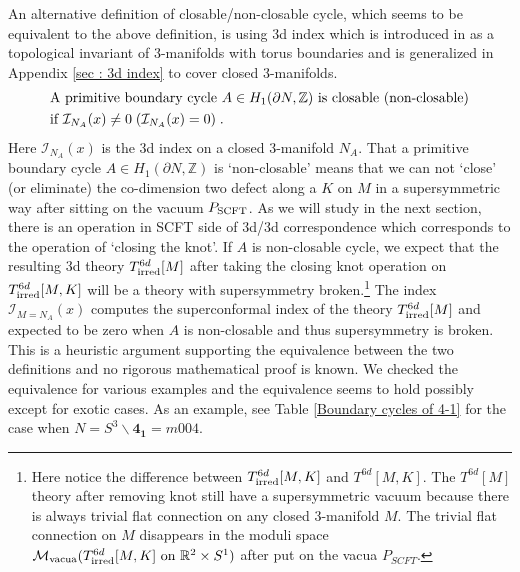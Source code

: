 \documentclass[a4paper,11pt]{article}
\def\CM{{\cal M}}
\begin{document}
An alternative definition of closable/non-closable cycle, which seems to be equivalent to the above definition, is using 3d index which is introduced  in \cite{Dimofte:2011py} as  a topological invariant of  3-manifolds with torus boundaries and is generalized in  Appendix \ref{sec : 3d index} to cover closed 3-manifolds.
%
\begin{align}
\begin{split}
&\textrm{A primitive boundary cycle $A\in H_1 (\partial N, \mathbb{Z})$ is closable (non-closable)}
\\
&\textrm{if $\mathcal{I}_{N_A}(x) \neq 0$\;($\mathcal{I}_{N_A}(x) = 0$)\;.} 
\end{split}
\end{align}
%
Here $\mathcal{I}_{N_A}(x)$ is the 3d index on a closed 3-manifold $N_A$. That a primitive boundary cycle $A \in H_1 (\partial N, \mathbb{Z})$ is `non-closable' means that we can not `close' (or eliminate) the co-dimension two defect  along a $K$ on $M$ in a supersymmetric way after sitting on the vacuum $P_{\rm SCFT}$.   As we will study in the next section, there is an operation in SCFT side of 3d/3d correspondence which corresponds to the operation of  `closing  the knot'. If $A$ is non-closable cycle, we expect that the resulting 3d theory $T^{6d}_{\rm irred}[M]$ after taking the closing  knot  operation on $T^{6d}_{\rm irred}[M,K]$ will be a theory with supersymmetry broken.\footnote{Here notice the difference between $T^{6d}_{\rm irred}[M,K]$ and $T^{6d}[M,K]$. 
The  $T^{6d}[M]$ theory after removing knot still have a supersymmetric vacuum because there is  always trivial flat connection on any closed 3-manifold $M$. The trivial flat connection on $M$ disappears  in the moduli space $\CM_{\rm vacua}(T^{6d}_{\rm irred}[M,K] \textrm{ on }\mathbb{R}^2\times S^1)$  after put on the vacua $P_{SCFT}$.  } 
The index $\mathcal{I}_{M=N_A}(x)$  computes the superconformal index of the theory  $T^{6d}_{\rm irred}[M]$ and expected to be zero when  $A$ is non-closable and thus supersymmetry is broken. This is a heuristic argument supporting the equivalence between the two definitions and no rigorous mathematical proof is known. We checked the equivalence for various examples and the equivalence seems to hold possibly except  for exotic cases. As an example, see Table \ref{Boundary cycles of 4-1} for the case when $N=S^3\backslash \mathbf{4_1}=m004$.
%
\end{document}
